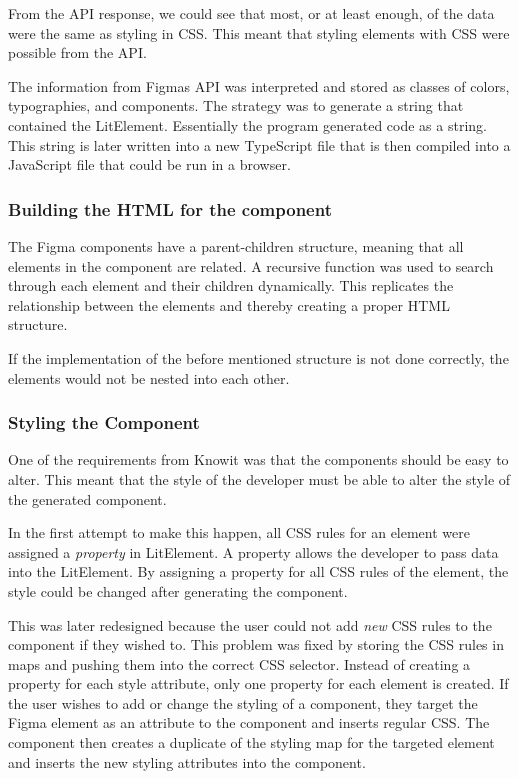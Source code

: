 From the API response, we could see that most, or at least enough, of the data were the same as styling in CSS. This meant that styling elements with CSS were possible from the API.

The information from Figmas API was interpreted and stored as classes of colors, typographies, and components. The strategy was to generate a string that contained the LitElement. Essentially the program generated code as a string. This string is later written into a new TypeScript file that is then compiled into a JavaScript file that could be run in a browser.

\subsubsection{Building the HTML for the component}%
\label{ssub:building the skeleton of the component}
The Figma components have a parent-children structure, meaning that all elements in the component are related. A recursive function was used to search through each element and their children dynamically. This replicates the relationship between the elements and thereby creating a proper HTML structure.

If the implementation of the before mentioned structure is not done correctly, the elements would not be nested into each other.


\subsubsection{Styling the Component}%
\label{ssub:Styling the component}
One of the requirements from Knowit was that the components should be easy to alter. This meant that the style of the developer must be able to alter the style of the generated component. 

In the first attempt to make this happen, all CSS rules for an element were assigned a \textit{property} in LitElement. A property allows the developer to pass data into the LitElement. By assigning a property for all CSS rules of the element, the style could be changed after generating the component.

This was later redesigned because the user could not add \textit{new} CSS rules to the component if they wished to. This problem was fixed by storing the CSS rules in maps\cite{ArrayPrototypeMap} and pushing them into the correct CSS selector. Instead of creating a property for each style attribute, only one property for each element is created. If the user wishes to add or change the styling of a component, they target the Figma element as an attribute to the component and inserts regular CSS. The component then creates a duplicate of the styling map for the targeted element and inserts the new styling attributes into the component.


